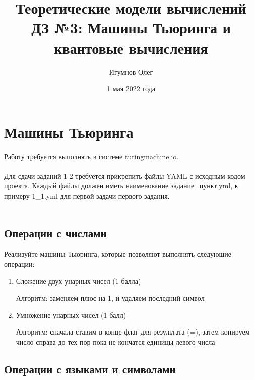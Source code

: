 \documentclass{article}
\title{Теоретические модели вычислений \\
ДЗ №3: Машины Тьюринга и квантовые вычисления}
\author{Игумнов Олег}
\date{1 мая 2022 года}
\begin{document}
\maketitle



\section{Машины Тьюринга}

Работу требуется выполнять в системе \url{turingmachine.io}. \\\\
Для сдачи заданий 1-2 требуется прикрепить файлы YAML с исходным кодом проекта. Каждый файлы должен иметь наименование задание\_пункт.yml, к примеру 1\_1.yml для первой задачи первого задания. \\\\

\subsection{Операции с числами}

Реализуйте машины Тьюринга, которые позволяют выполнять следующие операции:
\begin{enumerate}
    \item Сложение двух унарных чисел (1 балла)
    
    Алгоритм: заменяем плюс на 1, и удаляем последний символ
    
    \item Умножение унарных чисел (1 балл)
    
    Алгоритм: сначала ставим в конце флаг для результата (=), затем
    копируем число справа до тех пор пока не кончатся единицы левого числа
    
\end{enumerate}


\subsection{Операции с языками и символами}
\end{document}
